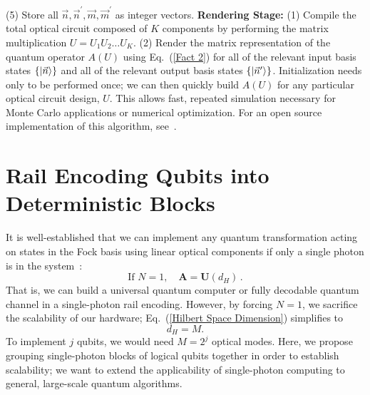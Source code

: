 \documentclass[aps,pra,twocolumn,showpacs,superscriptaddress,floatfix,10pt]{revtex4}
\begin{document}
		\newline
		\newline
		(5) Store all $\vec{n}, \vec{n}^\prime, \vec{m}, \vec{m}^\prime$ as integer vectors.
		\newline
		\newline
\textbf{Rendering Stage:}
\newline
\newline
		(1)  Compile the total optical circuit composed of $K$ components by performing the matrix multiplication $ U = U_1 U_2 \dots U_K $.
		\newline
		\newline
		(2) Render the matrix representation of the quantum operator $A(U)$ using Eq.~(\ref{Fact 2}) for all of the relevant input basis states $\{\ket{\vec{n}}\}$ and all of the relevant output basis states $\{\ket{\vec{n}^\prime}\}$.
\newline
\newline \indent
 Initialization needs only to be performed once; we can then quickly build $A(U)$ for any particular optical circuit design, $U$. This allows fast, repeated simulation necessary for Monte Carlo applications or numerical optimization. For an open source implementation of this algorithm, see~\cite{GitHub}.
\section{Rail Encoding Qubits into Deterministic Blocks}
\label{Section Block Encoding}
It is well-established that we can implement any quantum transformation acting on states in the Fock basis using linear optical components if only a single photon is in the system~\cite{Adami,Torma,Pittman}:
\begin{equation}
\label{Isomorphism}
	\mbox{If } N=1, \quad \textbf{A} = \textbf{U}(d_H)\,.
\end{equation}
That is, we can build a universal quantum computer or fully decodable quantum channel in a single-photon rail encoding. However, by forcing $N=1$, we sacrifice the scalability of our hardware; Eq.~(\ref{Hilbert Space Dimension}) simplifies to
\begin{equation}
d_H = M.
\end{equation}
To implement $j$ qubits, we would need $M=2^j$ optical modes. Here, we propose grouping single-photon blocks of logical qubits together in order to establish scalability; we want to extend the applicability of single-photon computing to general, large-scale quantum algorithms. 
\end{document}
